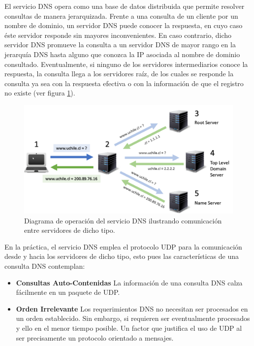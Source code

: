 El servicio DNS \cite{rfc:1034, rfc:1035} opera como una base de datos distribuida que permite resolver consultas de manera jerarquizada. Frente a una consulta de un cliente por un nombre de dominio, un servidor DNS puede conocer la respuesta, en cuyo caso éste servidor responde sin mayores inconvenientes. En caso contrario, dicho servidor DNS promueve la consulta a un servidor DNS de mayor rango en la jerarquía DNS hasta alguno que conozca la IP asociada al nombre de dominio consultado. Eventualmente, si ninguno de los servidores intermediarios conoce la respuesta, la consulta llega a los servidores raíz, de los cuales se responde la consulta ya sea con la respuesta efectiva o con la información de que el registro no existe (ver figura \ref{fig:dns}).

\begin{figure}[!h]
	\centering
	\includegraphics[scale=0.7]{imagenes/dns-system}
	\caption{Diagrama de operación del servicio DNS ilustrando comunicación entre servidores de dicho tipo.}
	\label{fig:dns}
\end{figure}

En la práctica, el servicio DNS emplea el protocolo UDP para la comunicación desde y hacia los servidores de dicho tipo, esto pues las características de una consulta DNS contemplan:

\begin{itemize}
\item \textbf{Consultas Auto-Contenidas} La información de una consulta DNS calza fácilmente en un paquete de UDP.
\item \textbf{Orden Irrelevante} Los requerimientos DNS no necesitan ser procesados en un orden establecido. Sin embargo, si requieren ser eventualmente procesados y ello en el menor tiempo posible. Un factor que justifica el uso de UDP al ser precisamente un protocolo orientado a mensajes.
\end{itemize}

